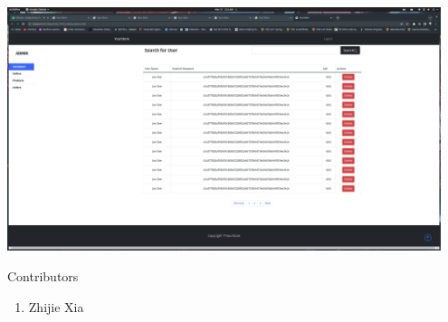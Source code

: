 \documentclass[12pt]{article}
\begin{document}
\includegraphics[width=0.95\textwidth]{Screenshots/admin.png}
\newpage

Contributors
\begin{enumerate}
    \item Zhijie Xia
\end{enumerate}
\end{document}
